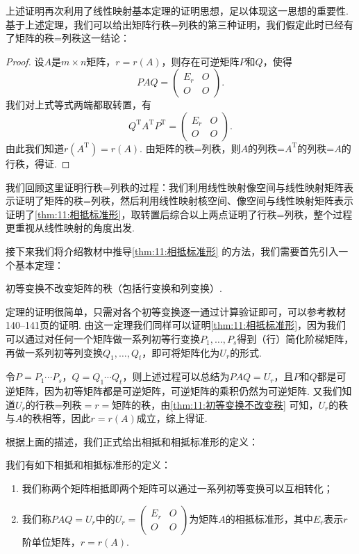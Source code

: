 上述证明再次利用了线性映射基本定理的证明思想，足以体现这一思想的重要性. 基于上述定理，我们可以给出矩阵行秩=列秩的第三种证明，我们假定此时已经有了矩阵的秩=列秩这一结论：

\begin{proof} \label{pf:11:矩阵行秩=列秩}
    设$A$是$m\times n$矩阵，$r=r(A)$，则存在可逆矩阵$P$和$Q$，使得
    \[PAQ=\begin{pmatrix}
            E_r & O \\ O & O
        \end{pmatrix}.\]
    我们对上式等式两端都取转置，有
    \[Q^\mathrm{T}A^\mathrm{T}P^\mathrm{T}=\begin{pmatrix}
            E_r & O \\ O & O
        \end{pmatrix}.\]
    由此我们知道$r(A^\mathrm{T})=r(A)$. 由矩阵的秩=列秩，则$A$的列秩=$A^\mathrm{T}$的列秩=$A$的行秩，得证.
\end{proof}

我们回顾这里证明行秩=列秩的过程：我们利用线性映射像空间与线性映射矩阵表示证明了矩阵的秩=列秩，然后利用线性映射核空间、像空间与线性映射矩阵表示证明了\autoref{thm:11:相抵标准形}，取转置后综合以上两点证明了行秩=列秩，整个过程更重视从线性映射的角度出发.

接下来我们将介绍教材中推导\autoref*{thm:11:相抵标准形} 的方法，我们需要首先引入一个基本定理：
\begin{theorem}\label{thm:11:初等变换不改变秩}
    初等变换不改变矩阵的秩（包括行变换和列变换）.
\end{theorem}
定理的证明很简单，只需对各个初等变换逐一通过计算验证即可，可以参考教材140--141页的证明. 由这一定理我们同样可以证明\autoref*{thm:11:相抵标准形}，因为我们可以通过对任何一个矩阵做一系列初等行变换$P_1,\ldots,P_s$得到（行）简化阶梯矩阵，再做一系列初等列变换$Q_1,\ldots,Q_t$，即可将矩阵化为$U_r$的形式.

令$P=P_1\cdots P_s$，$Q=Q_1\cdots Q_t$，则上述过程可以总结为$PAQ=U_r$，且$P$和$Q$都是可逆矩阵，因为初等矩阵都是可逆矩阵，可逆矩阵的乘积仍然为可逆矩阵. 又我们知道$U_r$的行秩=列秩$=r=$矩阵的秩，由\autoref{thm:11:初等变换不改变秩} 可知，$U_r$的秩与$A$的秩相等，因此$r=r(A)$成立，综上得证.

根据上面的描述，我们正式给出相抵和相抵标准形的定义：
\begin{definition}
    我们有如下相抵和相抵标准形的定义：
    \begin{enumerate}
        \item 我们称两个矩阵相抵即两个矩阵可以通过一系列初等变换可以互相转化；

        \item 我们称$PAQ=U_r$中的$U_r=\begin{pmatrix}
                      E_r & O \\ O & O
                  \end{pmatrix}$为矩阵$A$的相抵标准形，其中$E_r$表示$r$阶单位矩阵，$r=r(A)$.
    \end{enumerate}
\end{definition}


